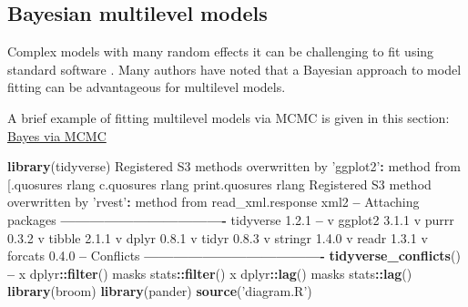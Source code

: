 \documentclass[]{article}
\newenvironment{Shaded}{\begin{snugshade}}{\end{snugshade}}
\newcommand{\DecValTok}[1]{\textcolor[rgb]{0.00,0.00,0.81}{#1}}
\newcommand{\FloatTok}[1]{\textcolor[rgb]{0.00,0.00,0.81}{#1}}
\newcommand{\KeywordTok}[1]{\textcolor[rgb]{0.13,0.29,0.53}{\textbf{#1}}}
\newcommand{\NormalTok}[1]{#1}
\newcommand{\OperatorTok}[1]{\textcolor[rgb]{0.81,0.36,0.00}{\textbf{#1}}}
\newcommand{\StringTok}[1]{\textcolor[rgb]{0.31,0.60,0.02}{#1}}
\begin{document}
\hypertarget{multilevel-bayes-reasons}{%
\subsection*{Bayesian multilevel models}\label{multilevel-bayes-reasons}}

Complex models with many random effects it can be challenging to fit using
standard software \citep[see eager2017mixed and][]{gelman2014bayesian}. Many authors
have noted that a Bayesian approach to model fitting can be advantageous for
multilevel models.

A brief example of fitting multilevel models via MCMC is given in this section:
\protect\hyperlink{bayes-mcmc}{Bayes via MCMC}

\begin{Shaded}
\begin{Highlighting}[]
\KeywordTok{library}\NormalTok{(tidyverse)}
\NormalTok{Registered S3 methods overwritten by }\StringTok{'ggplot2'}\OperatorTok{:}
\StringTok{  }\NormalTok{method         from }
\NormalTok{  [.quosures     rlang}
\NormalTok{  c.quosures     rlang}
\NormalTok{  print.quosures rlang}
\NormalTok{Registered S3 method overwritten by }\StringTok{'rvest'}\OperatorTok{:}
\StringTok{  }\NormalTok{method            from}
\NormalTok{  read_xml.response xml2}
\OperatorTok{--}\StringTok{ }\NormalTok{Attaching packages }\OperatorTok{----------------------------------}\StringTok{ }\NormalTok{tidyverse }\DecValTok{1}\NormalTok{.}\FloatTok{2.1} \OperatorTok{--}
\NormalTok{v ggplot2 }\DecValTok{3}\NormalTok{.}\FloatTok{1.1}\NormalTok{     v purrr   }\DecValTok{0}\NormalTok{.}\FloatTok{3.2}
\NormalTok{v tibble  }\DecValTok{2}\NormalTok{.}\FloatTok{1.1}\NormalTok{     v dplyr   }\DecValTok{0}\NormalTok{.}\FloatTok{8.1}
\NormalTok{v tidyr   }\DecValTok{0}\NormalTok{.}\FloatTok{8.3}\NormalTok{     v stringr }\DecValTok{1}\NormalTok{.}\FloatTok{4.0}
\NormalTok{v readr   }\DecValTok{1}\NormalTok{.}\FloatTok{3.1}\NormalTok{     v forcats }\DecValTok{0}\NormalTok{.}\FloatTok{4.0}
\OperatorTok{--}\StringTok{ }\NormalTok{Conflicts }\OperatorTok{-------------------------------------}\StringTok{ }\KeywordTok{tidyverse_conflicts}\NormalTok{() }\OperatorTok{--}
\NormalTok{x dplyr}\OperatorTok{::}\KeywordTok{filter}\NormalTok{() masks stats}\OperatorTok{::}\KeywordTok{filter}\NormalTok{()}
\NormalTok{x dplyr}\OperatorTok{::}\KeywordTok{lag}\NormalTok{()    masks stats}\OperatorTok{::}\KeywordTok{lag}\NormalTok{()}
\KeywordTok{library}\NormalTok{(broom)}
\KeywordTok{library}\NormalTok{(pander)}
\KeywordTok{source}\NormalTok{(}\StringTok{'diagram.R'}\NormalTok{)}
\end{Highlighting}
\end{Shaded}
\end{document}

